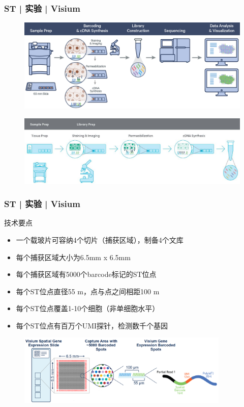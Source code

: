 \documentclass[11pt]{ctexbeamer}
\begin{document}
\begin{frame}
	\frametitle{ST | 实验 | Visium}
		\begin{figure}
		\includegraphics[width=\textwidth]{ST_workflow_04.png}
	\end{figure}
\vspace{-0.5em}
	\begin{figure}
		\includegraphics[width=\textwidth]{ST_workflow_06.png}
	\end{figure}
\end{frame}

\begin{frame}
	\frametitle{ST | 实验 | Visium}
	\begin{block}{技术要点}
		\begin{itemize}
			\item 一个载玻片可容纳4个切片（捕获区域），制备4个文库
			\item 每个捕获区域大小为6.5mm x 6.5mm
			\item 每个捕获区域有5000个barcode标记的ST位点
			\item 每个ST位点直径55 \textmu m，点与点之间相距100 \textmu m
			\item 每个ST位点覆盖1-10个细胞\alert{（非单细胞水平）}
			\item 每个ST位点有百万个UMI探针，检测数千个基因
		\end{itemize}
		\end{block}
	\vspace{-0.5em}
		\begin{figure}
		\includegraphics[width=0.9\textwidth]{ST_design_01.png}
	\end{figure}
\end{frame}
\end{document}
